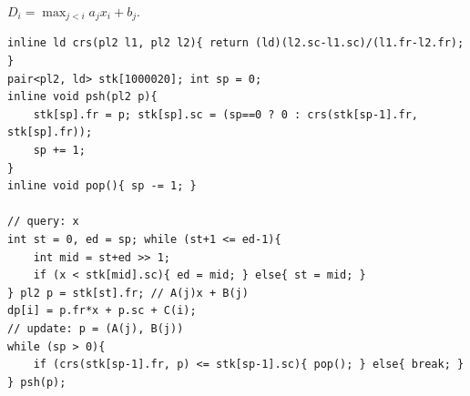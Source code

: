 $D_i = \max_{j < i} a_j x_i + b_j$.

\begin{verbatim}
inline ld crs(pl2 l1, pl2 l2){ return (ld)(l2.sc-l1.sc)/(l1.fr-l2.fr); }
pair<pl2, ld> stk[1000020]; int sp = 0;
inline void psh(pl2 p){
	stk[sp].fr = p; stk[sp].sc = (sp==0 ? 0 : crs(stk[sp-1].fr, stk[sp].fr));
	sp += 1;
}
inline void pop(){ sp -= 1; }

// query: x
int st = 0, ed = sp; while (st+1 <= ed-1){
	int mid = st+ed >> 1;
	if (x < stk[mid].sc){ ed = mid; } else{ st = mid; }
} pl2 p = stk[st].fr; // A(j)x + B(j)
dp[i] = p.fr*x + p.sc + C(i);
// update: p = (A(j), B(j))
while (sp > 0){
	if (crs(stk[sp-1].fr, p) <= stk[sp-1].sc){ pop(); } else{ break; }
} psh(p);
\end{verbatim}